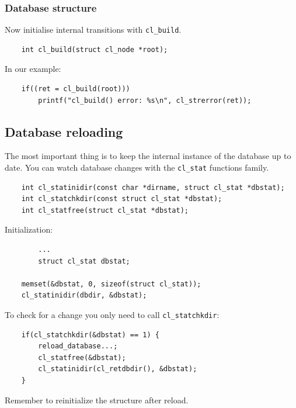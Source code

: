 \documentclass[a4paper,titlepage,12pt]{article}
\begin{document}
    \subsubsection{Database structure}
    Now initialise internal transitions with \verb+cl_build+.
    \begin{verbatim}
	int cl_build(struct cl_node *root);
    \end{verbatim}
    In our example:
    \begin{verbatim}
	if((ret = cl_build(root)))
	    printf("cl_build() error: %s\n", cl_strerror(ret));
    \end{verbatim}

    \subsection{Database reloading}
    The most important thing is to keep the internal instance of the database
    up to date. You can watch database changes with the \verb+cl_stat+
    functions family.
    \begin{verbatim}
	int cl_statinidir(const char *dirname, struct cl_stat *dbstat);
	int cl_statchkdir(const struct cl_stat *dbstat);
	int cl_statfree(struct cl_stat *dbstat);
    \end{verbatim}
    Initialization:
    \begin{verbatim}
	    ...
	    struct cl_stat dbstat;

	memset(&dbstat, 0, sizeof(struct cl_stat));
	cl_statinidir(dbdir, &dbstat);
    \end{verbatim}
    To check for a change you only need to call \verb+cl_statchkdir+:
    \begin{verbatim}
	if(cl_statchkdir(&dbstat) == 1) {
	    reload_database...;
	    cl_statfree(&dbstat);
	    cl_statinidir(cl_retdbdir(), &dbstat);
	}
    \end{verbatim}
    Remember to reinitialize the structure after reload.
\end{document}
